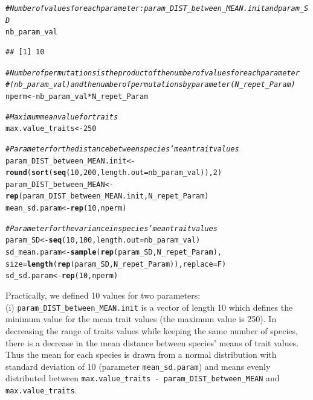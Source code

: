 \documentclass[12pt]{article}\usepackage[]{graphicx}\usepackage[]{color}
\makeatletter
\newcommand{\hlnum}[1]{\textcolor[rgb]{0.686,0.059,0.569}{#1}}%
\newcommand{\hlcom}[1]{\textcolor[rgb]{0.678,0.584,0.686}{\textit{#1}}}%
\newcommand{\hlopt}[1]{\textcolor[rgb]{0,0,0}{#1}}%
\newcommand{\hlstd}[1]{\textcolor[rgb]{0.345,0.345,0.345}{#1}}%
\newcommand{\hlkwb}[1]{\textcolor[rgb]{0.69,0.353,0.396}{#1}}%
\newcommand{\hlkwc}[1]{\textcolor[rgb]{0.333,0.667,0.333}{#1}}%
\newcommand{\hlkwd}[1]{\textcolor[rgb]{0.737,0.353,0.396}{\textbf{#1}}}%
\newenvironment{kframe}{%
 \def\at@end@of@kframe{}%
 \ifinner\ifhmode%
  \def\at@end@of@kframe{\end{minipage}}%
  \begin{minipage}{\columnwidth}%
 \fi\fi%
 \def\FrameCommand##1{\hskip\@totalleftmargin \hskip-\fboxsep
 \colorbox{shadecolor}{##1}\hskip-\fboxsep
     \hskip-\linewidth \hskip-\@totalleftmargin \hskip\columnwidth}%
 \MakeFramed {\advance\hsize-\width
   \@totalleftmargin\z@ \linewidth\hsize
   \@setminipage}}%
 {\par\unskip\endMakeFramed%
 \at@end@of@kframe}
\newenvironment{knitrout}{}{} %
\makeatother
\begin{document}
\begin{knitrout}\small
{}\color{fgcolor}\begin{kframe}
\begin{alltt}
\hlcom{# Number of values for each parameter: param_DIST_between_MEAN.init and param_SD}
\hlstd{nb_param_val}
\end{alltt}
\begin{verbatim}
## [1] 10
\end{verbatim}
\begin{alltt}
\hlcom{# Number of permutations is the product of the number of values for each parameter}
\hlcom{#(nb_param_val) and the number of permutations by parameter (N_repet_Param)}
\hlstd{nperm} \hlkwb{<-} \hlstd{nb_param_val} \hlopt{*} \hlstd{N_repet_Param}

\hlcom{# Maximum mean value for traits}
\hlstd{max.value_traits} \hlkwb{<-} \hlnum{250}

\hlcom{# Parameter for the distance between species' mean trait values}
\hlstd{param_DIST_between_MEAN.init} \hlkwb{<-} \hlkwd{round}\hlstd{(}\hlkwd{sort}\hlstd{(}\hlkwd{seq}\hlstd{(}\hlnum{10}\hlstd{,} \hlnum{200}\hlstd{,} \hlkwc{length.out} \hlstd{= nb_param_val)),} \hlnum{2}\hlstd{)}
\hlstd{param_DIST_between_MEAN} \hlkwb{<-} \hlkwd{rep}\hlstd{(param_DIST_between_MEAN.init, N_repet_Param)}
\hlstd{mean_sd.param} \hlkwb{<-} \hlkwd{rep}\hlstd{(}\hlnum{10}\hlstd{, nperm)}

\hlcom{# Parameter for the variance in species' mean trait values}
\hlstd{param_SD} \hlkwb{<-} \hlkwd{seq}\hlstd{(}\hlnum{10}\hlstd{,} \hlnum{100}\hlstd{,}\hlkwc{length.out} \hlstd{= nb_param_val)}
\hlstd{sd_mean.param} \hlkwb{<-} \hlkwd{sample} \hlstd{(}\hlkwd{rep}\hlstd{(param_SD, N_repet_Param),}
       \hlkwc{size} \hlstd{=} \hlkwd{length}\hlstd{(}\hlkwd{rep}\hlstd{(param_SD, N_repet_Param)),} \hlkwc{replace} \hlstd{= F)}
\hlstd{sd_sd.param} \hlkwb{<-} \hlkwd{rep}\hlstd{(}\hlnum{10}\hlstd{, nperm)}
\end{alltt}
\end{kframe}
\end{knitrout}


 Practically, we defined 10 values for two parameters:
\\

 (i) \texttt{param\_{}DIST\_{}between\_{}MEAN.init} is a vector of length 10 which defines the minimum value for the mean trait values (the maximum value is 250). In decreasing the range of traits values while keeping the same number of species, there is a decrease in the mean distance between species' means of trait values. Thus the mean for each species is drawn from a normal distribution with standard deviation of 10 (parameter \texttt{mean\_{}sd.param}) and means evenly distributed between \texttt{max.value\_{}traits - param\_{}DIST\_{}between\_{}MEAN} and \texttt{max.value\_{}traits}.
\\
\end{document}
